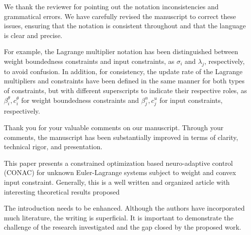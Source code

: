 \documentclass[12pt,english]{reviewresponse}
\begin{document}
\begin{revresponse}
	We thank the reviewer for pointing out the notation inconsistencies and grammatical errors. 
  We have carefully revised the manuscript to correct these issues, ensuring that the notation is consistent throughout and that the language is clear and precise.

  For example, the Lagrange multiplier notation has been distinguished between weight boundedness constraints and input constraints, as $\sigma_i$ and $\lambda_j$, respectively, to avoid confusion.
  In addition, for consistency, the update rate of the Lagrange multipliers and constraints have been defined in the same manner for both types of constraints, but with different superscripts to indicate their respective roles, as $\beta_i^\theta, c_i^\theta$ for weight boundedness constraints and $\beta_j^u, c_j^u$ for input constraints, respectively.

\end{revresponse}

\begin{concludingresponse}[]
	Thank you for your valuable comments on our manuscript. 
  Through your comments, the manuscript has been substantially improved in terms of clarity, technical rigor, and presentation.
\end{concludingresponse}

\reviewer
\begin{generalcomment}
	This paper presents a constrained optimization based neuro-adaptive control (CONAC) for unknown Euler-Lagrange systems subject to weight and convex input constraint. Generally, this is a well written and organized article with interesting theoretical results proposed
\end{generalcomment}

% 
\begin{revcomment}[1][1]{}
	The introduction needs to be enhanced. Although the authors have incorporated much literature, the writing is superficial. It is important to demonstrate the challenge of the research investigated and the gap closed by the proposed work.
\end{revcomment}
\end{document}
